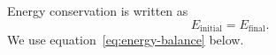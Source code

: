 \documentclass{article}
\begin{document}
Energy conservation is written as
\begin{equation}\label{eq:energy-balance}
  E_{\mathrm{initial}}=E_{\mathrm{final}}.
\end{equation}
We use equation~\eqref{eq:energy-balance} below.
\end{document}
